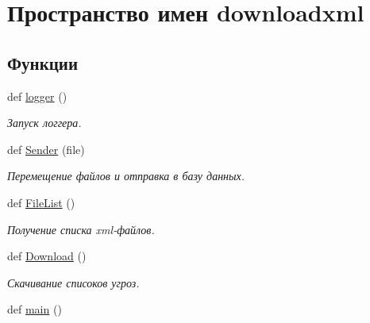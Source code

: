 \hypertarget{namespacedownloadxml}{}\section{Пространство имен downloadxml}
\label{namespacedownloadxml}
\subsection*{Функции}
\begin{DoxyCompactItemize}
\item 
def \hyperlink{namespacedownloadxml_abc3f6c8d51f9a903bb8504a7ad9ad2de}{logger} ()
\begin{DoxyCompactList}\small\item\em Запуск логгера. \end{DoxyCompactList}\item 
def \hyperlink{namespacedownloadxml_a7f19cfa93073885f474cf6a2a3f25e7f}{Sender} (file)
\begin{DoxyCompactList}\small\item\em Перемещение файлов и отправка в базу данных. \end{DoxyCompactList}\item 
def \hyperlink{namespacedownloadxml_ae15b4d4f7f282d34e48e03a2452741d6}{File\+List} ()
\begin{DoxyCompactList}\small\item\em Получение списка xml-\/файлов. \end{DoxyCompactList}\item 
def \hyperlink{namespacedownloadxml_a801fc32a7254a9319cb06fb65fb757e9}{Download} ()
\begin{DoxyCompactList}\small\item\em Скачивание списоков угроз. \end{DoxyCompactList}\item 
def \hyperlink{namespacedownloadxml_ac0d6bf93a1be6263a0b94ef18bb9c459}{main} ()
\end{DoxyCompactItemize}
